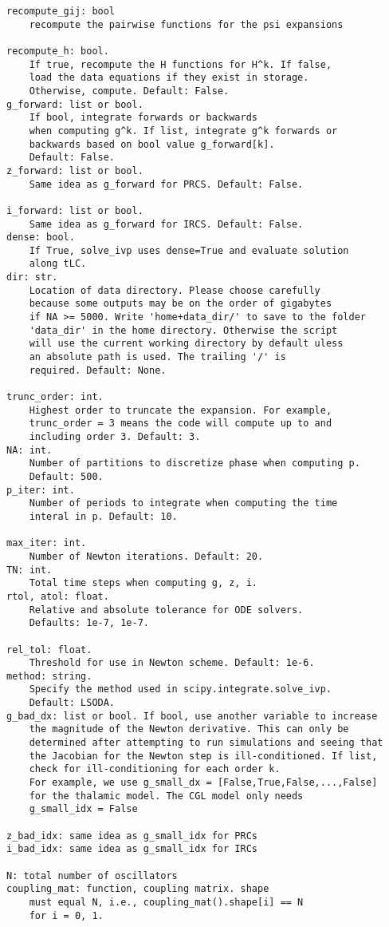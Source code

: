 \documentclass[english,a4paper,oneside]{article}
\begin{document}
\begin{verbatim}
recompute_gij: bool
    recompute the pairwise functions for the psi expansions

recompute_h: bool.
    If true, recompute the H functions for H^k. If false,
    load the data equations if they exist in storage.
    Otherwise, compute. Default: False.
g_forward: list or bool.
    If bool, integrate forwards or backwards
    when computing g^k. If list, integrate g^k forwards or
    backwards based on bool value g_forward[k].
    Default: False.
z_forward: list or bool.
    Same idea as g_forward for PRCS. Default: False.

i_forward: list or bool.
    Same idea as g_forward for IRCS. Default: False.
dense: bool.
    If True, solve_ivp uses dense=True and evaluate solution
    along tLC.
dir: str.
    Location of data directory. Please choose carefully
    because some outputs may be on the order of gigabytes
    if NA >= 5000. Write 'home+data_dir/' to save to the folder
    'data_dir' in the home directory. Otherwise the script
    will use the current working directory by default uless
    an absolute path is used. The trailing '/' is
    required. Default: None.

trunc_order: int.
    Highest order to truncate the expansion. For example, 
    trunc_order = 3 means the code will compute up to and 
    including order 3. Default: 3.
NA: int.
    Number of partitions to discretize phase when computing p.
    Default: 500.
p_iter: int.
    Number of periods to integrate when computing the time 
    interal in p. Default: 10.

max_iter: int.
    Number of Newton iterations. Default: 20.
TN: int.
    Total time steps when computing g, z, i.
rtol, atol: float.
    Relative and absolute tolerance for ODE solvers.
    Defaults: 1e-7, 1e-7.

rel_tol: float.
    Threshold for use in Newton scheme. Default: 1e-6.
method: string.
    Specify the method used in scipy.integrate.solve_ivp.
    Default: LSODA.
g_bad_dx: list or bool. If bool, use another variable to increase
    the magnitude of the Newton derivative. This can only be
    determined after attempting to run simulations and seeing that
    the Jacobian for the Newton step is ill-conditioned. If list,
    check for ill-conditioning for each order k.
    For example, we use g_small_dx = [False,True,False,...,False]
    for the thalamic model. The CGL model only needs
    g_small_idx = False

z_bad_idx: same idea as g_small_idx for PRCs
i_bad_idx: same idea as g_small_idx for IRCs

N: total number of oscillators
coupling_mat: function, coupling matrix. shape
    must equal N, i.e., coupling_mat().shape[i] == N
    for i = 0, 1.
\end{verbatim}
\end{document}
